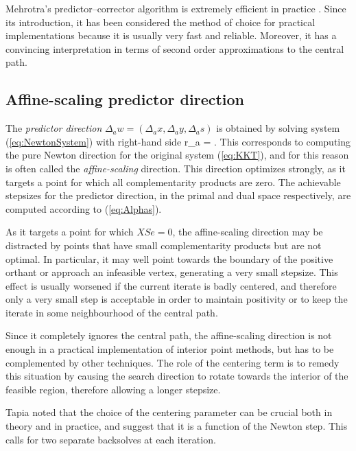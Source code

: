 Mehrotra's predictor--corrector algorithm 
is extremely efficient in practice \cite{LustigMarstenShanno,Mehrotra92}. 
Since its introduction, it has 
been considered the method of choice for practical implementations 
because it is usually very fast and reliable. Moreover, it has a 
convincing interpretation in terms of second order approximations
to the central path.

%
%
\subsection{Affine-scaling predictor direction}

The {\em predictor direction} 
$\Delta_a w = (\Delta_a x, \Delta_a y, \Delta_a s)$ is obtained by solving 
system (\ref{eq:NewtonSystem}) with right-hand side 
\be  \label{eq:PredictorRhs}
 r_a = .
\ee
This corresponds to computing the pure Newton direction for the
original \KKT system (\ref{eq:KKT}), and for this reason is often
called the {\em affine-scaling} direction. This 
direction optimizes strongly, as it targets a point for which 
all complementarity products are zero. 
The achievable stepsizes for the predictor direction, 
in the primal and dual space respectively, are computed 
according to (\ref{eq:Alphas}).

As it targets a point for which $XSe = 0$, the affine-scaling direction 
may be distracted by points that have small complementarity products 
but are not optimal. 
In particular, it may well point towards the boundary of the 
positive orthant or approach an infeasible vertex, generating 
a very small stepsize. 
This effect is usually worsened if the current iterate is badly centered, 
and therefore only a very small step is acceptable in order to 
maintain positivity or to keep the iterate in some neighbourhood 
of the central path.

Since it completely ignores the central path, the affine-scaling 
direction is not enough in a practical implementation of 
interior point methods, but has to be 
complemented by other techniques.
The role of the centering term is to remedy this situation by 
causing the search direction to rotate towards the interior 
of the feasible region,
therefore allowing a longer stepsize. 

Tapia \etal \cite{TapiaZhangSaltzmanWeiser} noted that the choice of the 
centering parameter can be crucial both in theory and in practice,
and suggest that it is a function of the Newton step. 
This calls for two separate backsolves at each iteration.

